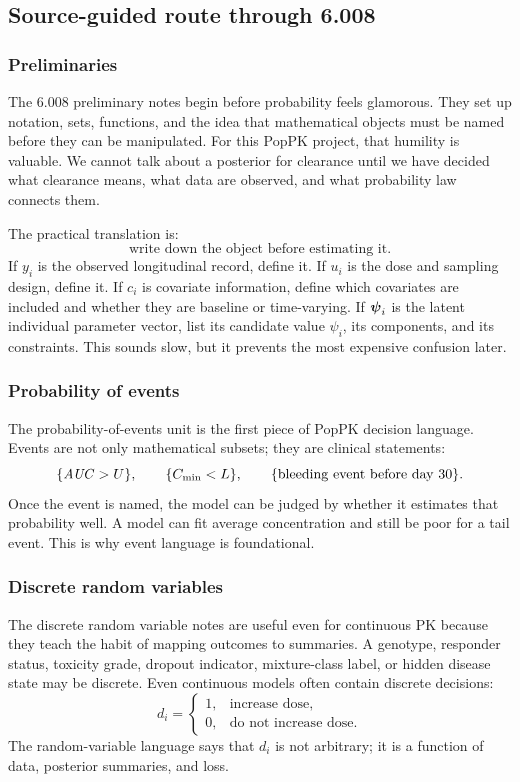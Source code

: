 \subsection{Source-guided route through 6.008}

\subsubsection*{Preliminaries}

The 6.008 preliminary notes begin before probability feels glamorous.  They set up notation, sets, functions, and the idea that mathematical objects must be named before they can be manipulated.  For this PopPK project, that humility is valuable.  We cannot talk about a posterior for clearance until we have decided what clearance means, what data are observed, and what probability law connects them.

The practical translation is:
\[
  \text{write down the object before estimating it.}
\]
If \(y_i\) is the observed longitudinal record, define it.  If \(u_i\) is the dose and sampling design, define it.  If \(c_i\) is covariate information, define which covariates are included and whether they are baseline or time-varying.  If \(\boldsymbol{\psi}_i\) is the latent individual parameter vector, list its candidate value \(\psi_i\), its components, and its constraints.  This sounds slow, but it prevents the most expensive confusion later.

\subsubsection*{Probability of events}

The probability-of-events unit is the first piece of PopPK decision language.  Events are not only mathematical subsets; they are clinical statements:
\[
  \{\pksym{AUC}>U\},
  \qquad
  \{C_{\min}<L\},
  \qquad
  \{\mathrm{bleeding\ event\ before\ day\ 30}\}.
\]
Once the event is named, the model can be judged by whether it estimates that probability well.  A model can fit average concentration and still be poor for a tail event.  This is why event language is foundational.

\subsubsection*{Discrete random variables}

The discrete random variable notes are useful even for continuous PK because they teach the habit of mapping outcomes to summaries.  A genotype, responder status, toxicity grade, dropout indicator, mixture-class label, or hidden disease state may be discrete.  Even continuous models often contain discrete decisions:
\[
  d_i=
  \begin{cases}
  1, & \text{increase dose},\\
  0, & \text{do not increase dose}.
  \end{cases}
\]
The random-variable language says that \(d_i\) is not arbitrary; it is a function of data, posterior summaries, and loss.

